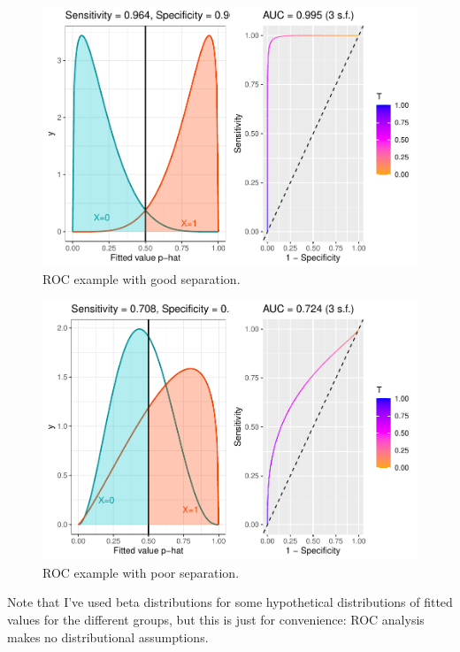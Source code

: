 \documentclass[
  openany]{book}
\theoremstyle{definition}
\theoremstyle{definition}
\theoremstyle{definition}
\theoremstyle{definition}
\theoremstyle{remark}
\begin{document}
\begin{figure}
\centering
\includegraphics{CT4H_notes_files/figure-latex/rocgood-1.pdf}
\caption{\label{fig:rocgood}ROC example with good separation.}
\end{figure}

\begin{figure}
\centering
\includegraphics{CT4H_notes_files/figure-latex/rocpoor-1.pdf}
\caption{\label{fig:rocpoor}ROC example with poor separation.}
\end{figure}

Note that I've used beta distributions for some hypothetical distributions of fitted values for the different groups, but this is just for convenience: ROC analysis makes no distributional assumptions.
\end{document}
